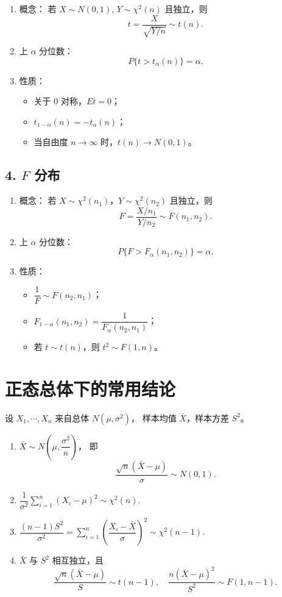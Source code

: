 \begin{enumerate}
      \item 概念：
            若 $X\sim N(0,1)$, $Y\sim\chi^2(n)$ 且独立，则
            $$t=\frac{X}{\sqrt{Y/n}}\sim t(n).$$
      \item 上 $\alpha$ 分位数：
            $$P\{t>t_\alpha(n)\}=\alpha.$$
      \item 性质：
            \begin{itemize}
                  \item 关于 0 对称，$E t = 0$；
                  \item $t_{1-\alpha}(n) = -t_\alpha(n)$；
                  \item 当自由度 $n\to\infty$ 时，$t(n)\to N(0,1)$。
            \end{itemize}
\end{enumerate}


\subsection*{4. $F$ 分布}

\begin{enumerate}
      \item 概念：
            若 $X\sim\chi^2(n_1)$，$Y\sim\chi^2(n_2)$ 且独立，则
            $$
                  F=\frac{X/n_1}{Y/n_2}\sim F(n_1,n_2).
            $$
      \item 上 $\alpha$ 分位数：
            $$P\{F>F_\alpha(n_1,n_2)\}=\alpha.$$
      \item 性质：
            \begin{itemize}
                  \item $\dfrac{1}{F}\sim F(n_2,n_1)$；
                  \item $F_{1-\alpha}(n_1,n_2)=\dfrac{1}{F_\alpha(n_2,n_1)}$；
                  \item 若 $t\sim t(n)$，则 $t^2\sim F(1,n)$。
            \end{itemize}
\end{enumerate}


\section{正态总体下的常用结论}

设 $X_1,\cdots,X_n$ 来自总体 $N(\mu,\sigma^2)$，
样本均值 $\bar{X}$，样本方差 $S^2$。

\begin{enumerate}
      \item $\bar{X}\sim N\!\left(\mu,\dfrac{\sigma^2}{n}\right)$，
            即
            $$\frac{\sqrt{n}(\bar{X}-\mu)}{\sigma}\sim N(0,1).$$
      \item $\dfrac{1}{\sigma^2}\sum_{i=1}^{n}(X_i-\mu)^2 \sim \chi^2(n).$
      \item $\dfrac{(n-1)S^2}{\sigma^2}=\sum_{i=1}^{n}\left(\dfrac{X_i-\bar{X}}{\sigma}\right)^2 \sim \chi^2(n-1).$
      \item $\bar{X}$ 与 $S^2$ 相互独立，且
            $$\frac{\sqrt{n}(\bar{X}-\mu)}{S}\sim t(n-1),\quad \frac{n(\bar{X}-\mu)^2}{S^2}\sim F(1,n-1).$$
\end{enumerate}


